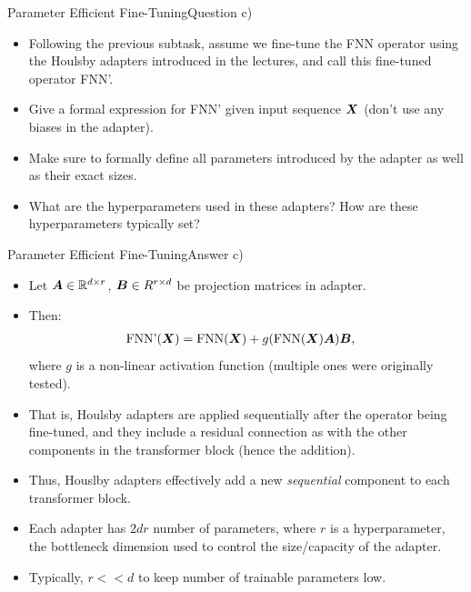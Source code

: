 \documentclass[t]{beamer}
\newcommand\op[1]{\operatorname{#1}}
\begin{document}
\begin{frame}{Parameter Efficient Fine-Tuning}{Question c)}
    \begin{itemize}
        \item Following the previous subtask, assume we fine-tune the FNN
              operator using the Houlsby adapters introduced in the lectures,
              and call this fine-tuned operator FNN'.
        \item Give a formal expression for FNN' given input sequence ${\boldsymbol{X}}$
              (don't use any biases in the adapter).
        \item Make sure to formally define all parameters introduced by the
              adapter as well as their exact sizes.
        \item What are the hyperparameters used in these adapters? How are these
              hyperparameters typically set?
    \end{itemize}
\end{frame}

\begin{frame}{Parameter Efficient Fine-Tuning}{Answer c)}
    \begin{itemize}
        \item Let ${\boldsymbol{A}} \in \mathbb{R}^{d\times r}$, ${\boldsymbol{B}} \in R^{r\times d}$ be
              projection matrices in adapter.
        \item Then:
              \begin{align}\label{houlsby}
                  \op{FNN'}(\mX) & =  \op{FNN}(\mX) + g(\op{FNN}(\mX)\mA)\mB,
              \end{align}
              where $g$ is a non-linear activation function (multiple ones were
              originally tested).
        \item That is, Houlsby adapters are applied sequentially after the
              operator being fine-tuned, and they include a residual connection
              as with the other components in the transformer block (hence the
              addition).
        \item Thus, Houslby adapters effectively add a new \emph{sequential}
              component to each transformer block.
        \item Each adapter has $2dr$ number of parameters, where $r$ is
              a hyperparameter, the bottleneck dimension used to control the
              size/capacity of the adapter.
        \item Typically, $r << d$ to keep number of trainable parameters
              low.
    \end{itemize}
\end{frame}
\end{document}
